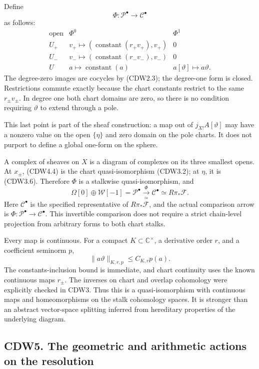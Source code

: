 Define \[
\Phi:\mathscr P^\bullet\longrightarrow\mathscr C^\bullet
\tag{CDW4.3}
\] as follows: \[
\begin{array}{c|c|c}
\text{open}&\Phi^0&\Phi^1\\ \hline
U_+&v_+\mapsto(\operatorname{constant}(r_+v_+),v_+)&0\\
U_-&v_-\mapsto(\operatorname{constant}(r_-v_-),v_-)&0\\
U&a\mapsto\operatorname{constant}(a)&
a[\vartheta]\mapsto a\vartheta.
\end{array}
\tag{CDW4.4}
\] The degree-zero images are cocycles by (CDW2.3); the degree-one form
is closed. Restrictions commute exactly because the chart constants
restrict to the same \(r_\pm v_\pm\). In degree one both chart domains
are zero, so there is no condition requiring \(\vartheta\) to extend
through a pole.

This last point is part of the sheaf construction: a map out of
\(j_{X!}A[\vartheta]\) may have a nonzero value on the open \(\{\eta\}\)
and zero domain on the pole charts. It does not purport to define a
global one-form on the sphere.

A complex of sheaves on \(X\) is a diagram of complexes on its three
smallest opens. At \(x_\pm\), (CDW4.4) is the chart quasi-isomorphism
(CDW3.2); at \(\eta\), it is (CDW3.6). Therefore \(\Phi\) is a stalkwise
quasi-isomorphism, and \[
\boxed{
\Omega[0]\oplus\mathscr W[-1]=\mathscr P^\bullet
\xrightarrow[\ \simeq\ ]{\ \Phi\ }
\mathscr C^\bullet\simeq R\pi_*\mathscr F.
}
\tag{CDW4.5}
\] Here \(\mathscr C^\bullet\) is the specified representative of
\(R\pi_*\mathscr F\), and the actual comparison arrow is
\(\Phi:\mathscr P^\bullet\to\mathscr C^\bullet\). This invertible
comparison does not require a strict chain-level projection from
arbitrary forms to both chart stalks.

Every map is continuous. For a compact \(K\subset\mathbb C^\times\), a
derivative order \(r\), and a coefficient seminorm \(p\), \[
\|a\vartheta\|_{K,r,p}\le C_{K,r}p(a).
\tag{CDW4.6}
\] The constants-inclusion bound is immediate, and chart continuity uses
the known continuous maps \(r_\pm\). The inverses on chart and overlap
cohomology were explicitly checked in CDW3. Thus this is a
quasi-isomorphism with continuous maps and homeomorphisms on the stalk
cohomology spaces. It is stronger than an abstract vector-space
splitting inferred from hereditary properties of the underlying diagram.

\subsection{CDW5. The geometric and arithmetic actions on the
resolution}\label{cdw5.-the-geometric-and-arithmetic-actions-on-the-resolution}

